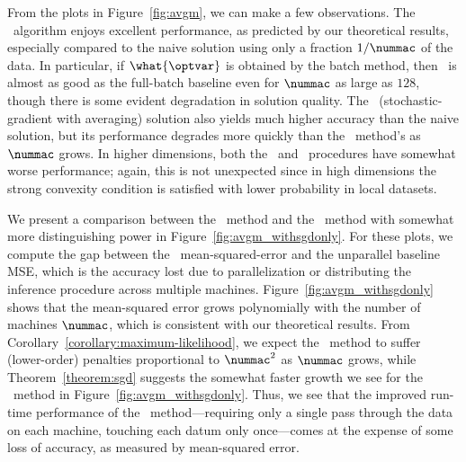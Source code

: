 \documentclass[11pt,twoside]{article}
\theoremstyle{definition}
\begin{document}
From the plots in Figure~\ref{fig:avgm}, we can make a few observations.  The
\avgm\ algorithm enjoys excellent performance, as predicted by our theoretical
results, especially compared to the naive solution using only a fraction
$1/\nummac$ of the data. In particular, if $\what{\optvar}$ is obtained by the
batch method, then \avgm\ is almost as good as the full-batch baseline even
for $\nummac$ as large as $128$, though there is some evident degradation in
solution quality. The \sgdavgm\ (stochastic-gradient with averaging) solution
also yields much higher accuracy than the naive solution, but its performance
degrades more quickly than the \avgm\ method's as $\nummac$ grows.  In higher
dimensions, both the \avgm\ and \sgdavgm\ procedures have somewhat worse
performance; again, this is not unexpected since in high dimensions the strong
convexity condition is satisfied with lower probability in local datasets.

We present a comparison between the \avgm\ method and the
\sgdavgm\ method with somewhat more distinguishing power in
Figure~\ref{fig:avgm_withsgdonly}. For these plots, we compute the gap
between the \avgm\ mean-squared-error and the unparallel baseline MSE,
which is the accuracy lost due to parallelization or distributing the
inference procedure across multiple machines.
Figure~\ref{fig:avgm_withsgdonly} shows that the mean-squared error
grows polynomially with the number of machines $\nummac$, which is
consistent with our theoretical
results. From Corollary~\ref{corollary:maximum-likelihood}, we
expect the \avgm\ method to suffer (lower-order) penalties
proportional to $\nummac^2$ as $\nummac$ grows, while
Theorem~\ref{theorem:sgd} suggests the somewhat faster growth we see
for the \sgdavgm\ method in Figure~\ref{fig:avgm_withsgdonly}.  Thus,
we see that the improved run-time performance of the
\sgdavgm\ method---requiring only a single pass through the data on
each machine, touching each datum only once---comes at the expense of
some loss of accuracy, as measured by mean-squared error.

\end{document}
